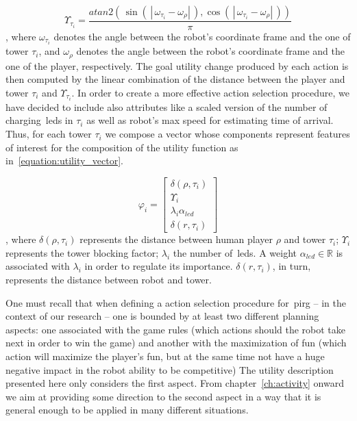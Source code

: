 \begin{equation}\label{equation:utility_function}
\Upsilon_{\tau_{i}} = \frac{atan2(\,
\sin(\,\left|\, \omega_{\tau_{i}}-\omega_{\rho}\right|\,),
\cos(\,\left|\,\omega_{\tau_{i}}-\omega_{\rho}\right|\,))}{\pi}
\end{equation}
, where $\omega_{\tau_{i}}$ denotes the angle between the robot's coordinate frame and the one of tower $\tau_{i}$, and $\omega_{\rho}$ denotes the angle between the robot's coordinate frame and the one of the player, respectively. The goal utility change produced by each action is then computed by the linear combination of the distance between the player and tower $\tau_{i}$ and $\Upsilon_{\tau_{i}}$. In order to create a more effective action selection procedure, we have decided to include also attributes like a scaled version of the number of charging~\gls{led}s in $\tau_{i}$ as well as robot's max speed for estimating time of arrival. Thus, for each tower $\tau_{i}$ we compose a vector whose components represent features of interest for the composition of the utility function as in~\ref{equation:utility_vector}.
 
\begin{equation}\label{equation:utility_vector}
\varphi_{i} = 
\begin{bmatrix}
    \delta(\rho,\tau_{i}) \\
    \Upsilon_{i}\\
    \lambda_{i}\alpha_{led}\\
    \delta(r,\tau_{i})
\end{bmatrix}
\end{equation}
, where $\delta(\rho,\tau_{i})$ represents the distance between human player $\rho$ and tower $\tau_{i}$; $\Upsilon_{i}$ represents the tower blocking factor; $\lambda_{i}$ the number of~\gls{led}s. A weight $\alpha_{led} \in \mathbb{R}$ is associated with $\lambda_{i}$ in order to regulate its importance. $\delta(r,\tau_{i})$, in turn, represents the distance between robot and tower.

One must recall that when defining a action selection procedure for~\gls{pirg} -- in the context of our research -- one is bounded by at least two different planning aspects: one associated with the game rules (which actions should the robot take next in order to win the game) and another with the maximization of fun (which action will maximize the player's fun, but at the same time not have a huge negative impact in the robot ability to be competitive) The utility description presented here only considers the first aspect. From chapter~\ref{ch:activity} onward we aim at providing some direction to the second aspect in a way that it is general enough to be applied in many different situations. 

